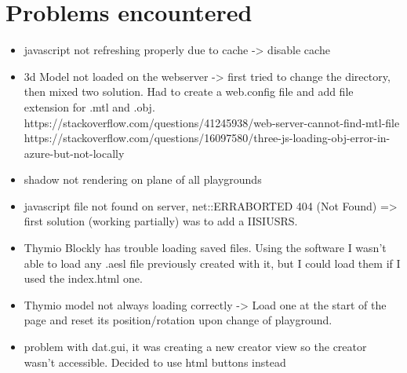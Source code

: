 \documentclass{scrbook}
\begin{document}
\chapter{Problems encountered}
\begin{itemize}
  \item javascript not refreshing properly due to cache -> disable cache
  \item 3d Model not loaded on the webserver -> first tried to change the directory, then mixed two solution. 
        Had to create a web.config file and add file extension for .mtl and .obj.
        https://stackoverflow.com/questions/41245938/web-server-cannot-find-mtl-file
        https://stackoverflow.com/questions/16097580/three-js-loading-obj-error-in-azure-but-not-locally
  \item shadow not rendering on plane of all playgrounds
  \item javascript file not found on server, net::ERR\textunderscore ABORTED 404 (Not Found) => first solution (working partially) was to add a IIS\textunderscore IUSRS.
  \item Thymio Blockly has trouble loading saved files. Using the software I wasn't able to load any .aesl file previously created with it, but I could load them if I used the index.html one.
  \item Thymio model not always loading correctly -> Load one at the start of the page and reset its position/rotation upon change of playground.
  \item problem with dat.gui, it was creating a new creator view so the creator wasn't accessible. Decided to use html buttons instead
\end{itemize}

\printbibliography[heading=bibintoc]
\end{document}
